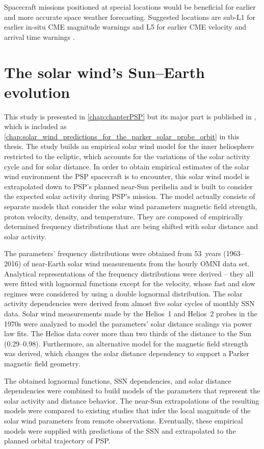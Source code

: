 Spacecraft missions positioned at special locations would be beneficial for earlier and more accurate space weather forecasting. Suggested locations are sub-L1 for earlier in-situ CME magnitude warnings and L5 for earlier CME velocity and arrival time warnings \citep{Vourlidas2015}.


\section{The solar wind's Sun--Earth evolution}
This study is presented in \autoref{chap:chapterPSP} but its major part is published in \citet{Venzmer2018}, which is included as \autoref{chap:solar_wind_predictions_for_the_parker_solar_probe_orbit} in this thesis.
The study builds an empirical solar wind model for the inner heliosphere restricted to the ecliptic, which accounts for the variations of the solar activity cycle and for solar distance. In order to obtain empirical estimates of the solar wind environment the PSP spacecraft is to encounter, this solar wind model is extrapolated down to PSP's planned near-Sun perihelia and is built to consider the expected solar activity during PSP's mission.
The model actually consists of separate models that consider the solar wind parameters magnetic field strength, proton velocity, density, and temperature. They are composed of empirically determined frequency distributions that are being shifted with solar distance and solar activity.

The parameters' frequency distributions were obtained from 53~years (1963--2016) of near-Earth solar wind measurements from the hourly OMNI data set. Analytical representations of the frequency distributions were derived -- they all were fitted with lognormal functions except for the velocity, whose fast and slow regimes were considered by using a double lognormal distribution. The solar activity dependencies were derived from almost five solar cycles of monthly SSN data. Solar wind measurements made by the Helios~1 and Helios~2 probes in the 1970s were analyzed to model the parameters' solar distance scalings via power law fits. The Helios data cover more than two thirds of the distance to the Sun (\SIrange{0.29}{0.98}{\au}). Furthermore, an alternative model for the magnetic field strength was derived, which changes the solar distance dependency to support a Parker magnetic field geometry.

The obtained lognormal functions, SSN dependencies, and solar distance dependencies were combined to build models of the parameters that represent the solar activity and distance behavior. The near-Sun extrapolations of the resulting models were compared to existing studies that infer the local magnitude of the solar wind parameters from remote observations. Eventually, these empirical models were supplied with predictions of the SSN and extrapolated to the planned orbital trajectory of PSP.

